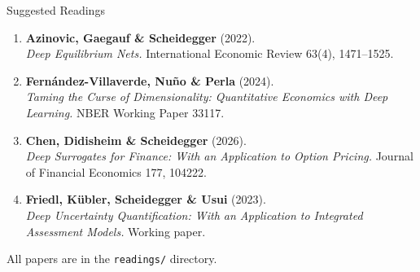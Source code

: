 \documentclass[aspectratio=169,11pt]{beamer}
\begin{document}
\begin{frame}{Suggested Readings}
\begin{enumerate}
    \item \textbf{Azinovic, Gaegauf \& Scheidegger} (2022).\\
    {\small \emph{Deep Equilibrium Nets.} International Economic Review 63(4), 1471--1525.}

    \vspace{0.3em}
    \item \textbf{Fern\'{a}ndez-Villaverde, Nu\~{n}o \& Perla} (2024).\\
    {\small \emph{Taming the Curse of Dimensionality: Quantitative Economics with Deep Learning.} NBER Working Paper 33117.}

    \vspace{0.3em}
    \item \textbf{Chen, Didisheim \& Scheidegger} (2026).\\
    {\small \emph{Deep Surrogates for Finance: With an Application to Option Pricing.} Journal of Financial Economics 177, 104222.}

    \vspace{0.3em}
    \item \textbf{Friedl, K\"{u}bler, Scheidegger \& Usui} (2023).\\
    {\small \emph{Deep Uncertainty Quantification: With an Application to Integrated Assessment Models.} Working paper.}
\end{enumerate}

\vspace{0.5em}
All papers are in the \texttt{readings/} directory.
\end{frame}


\end{document}
